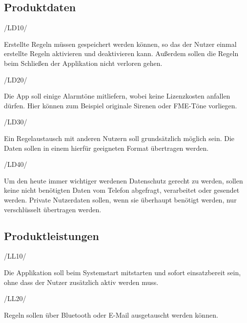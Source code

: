 \subsection{Produktdaten}
\begin{minipage}{3cm}
/LD10/
\end{minipage}
\begin{minipage}{13cm}
Erstellte Regeln m\"ussen gespeichert werden k\"onnen, so das der Nutzer einmal erstellte Regeln aktivieren und deaktivieren kann. Au\ss{}erdem sollen die Regeln beim Schlie\ss{}en der Applikation nicht verloren gehen.\\
\end{minipage}
\begin{minipage}{3cm}
/LD20/
\end{minipage}
\begin{minipage}{13cm}
Die App soll einige Alarmt\"one mitliefern, wobei keine Lizenzkosten anfallen d\"urfen. Hier k\"onnen zum Beispiel originale Sirenen oder \ac{FME}-T\"one vorliegen.\\
\end{minipage}
\begin{minipage}{3cm}
/LD30/
\end{minipage}
\begin{minipage}{13cm}
Ein Regelaustausch mit anderen Nutzern soll grunds\"atzlich m\"oglich sein. Die Daten sollen in einem hierf\"ur geeigneten Format \"ubertragen werden.\\
\end{minipage}
\begin{minipage}{3cm}
/LD40/
\end{minipage}
\begin{minipage}{13cm}
Um den heute immer wichtiger werdenen Datenschutz gerecht zu werden, sollen keine nicht ben\"otigten Daten vom Telefon abgefragt, verarbeitet oder gesendet werden. Private Nutzerdaten sollen, wenn sie \"uberhaupt ben\"otigt werden, nur verschl\"usselt \"ubertragen werden.\\
\end{minipage}

\subsection{Produktleistungen}
\begin{minipage}{3cm}
/LL10/
\end{minipage}
\begin{minipage}{13cm}
Die Applikation soll beim Systemstart mitstarten und sofort einsatzbereit sein, ohne dass der Nutzer zus\"atzlich aktiv werden muss.\\
\end{minipage}
\begin{minipage}{3cm}
/LL20/
\end{minipage}
\begin{minipage}{13cm}
Regeln sollen \"uber Bluetooth oder E-Mail ausgetauscht werden k\"onnen.\\
\end{minipage}